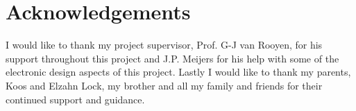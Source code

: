 \chapter{Acknowledgements}

I would like to thank my project supervisor, Prof. G-J van Rooyen, for his
support throughout this project and J.P. Meijers for his help with some of the
electronic design aspects of this project.
\newline
\newline
Lastly I would like to thank my parents, Koos and Elzahn Lock, my brother and
all my family and friends for their continued support and guidance. 



